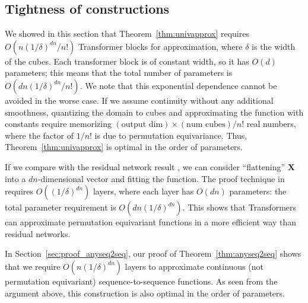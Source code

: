 \documentclass{article} %
\def\mX{{\bm{X}}}
\begin{document}
\vspace*{-10pt}
\subsection{Tightness of constructions}
\label{sec:tightness}
\vspace*{-5pt}
We showed in this section that Theorem~\ref{thm:univapprox} requires $O(n(1/\delta)^{dn}/n!)$ Transformer blocks for approximation, where $\delta$ is the width of the cubes.
Each transformer block is of constant width, so it has $O(d)$ parameters;
this means that the total number of parameters is $O(dn(1/\delta)^{dn}/n!)$.
We note that this exponential dependence cannot be avoided in the worse case. If we assume continuity without any additional smoothness, quantizing the domain to cubes and approximating the function with constants require memorizing $(\text{output dim}) \times (\text{num cubes}) /n!$ real numbers, where the factor of $1/n!$ is due to permutation equivariance. Thus, Theorem~\ref{thm:univapprox} is optimal in the order of parameters.

If we compare with the residual network result \citep{lin2018resnet}, we can consider ``flattening'' $\mX$ into a $dn$-dimensional vector and fitting the function. The proof technique in \citep{lin2018resnet} requires $O((1/\delta)^{dn})$ layers, where each layer has $O(dn)$ parameters: the total parameter requirement is $O(dn (1/\delta)^{dn})$. This shows that Transformers can approximate permutation equivariant functions in a more efficient way than residual networks.

In Section~\ref{sec:proof_anyseq2seq}, our proof of Theorem~\ref{thm:anyseq2seq} shows that we require $O(n(1/\delta)^{dn})$ layers to approximate continuous (not permutation equivariant) sequence-to-sequence functions. As seen from the argument above, this construction is also optimal in the order of parameters.




\vspace*{-6pt}
\end{document}
